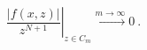 \begin{equation}
{ \left.
\frac{|f(x,z)|}{z^{N+1}}
\right|}_{z \in C_m}
\stackrel{m \to \infty }{\longrightarrow} 0\ .
\label{1.17}
\end{equation}

